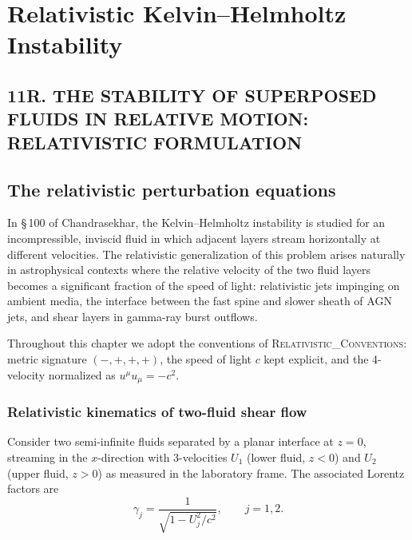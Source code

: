 
\chapter{Relativistic Kelvin--Helmholtz Instability}
\label{ch:rel-11-KH}

\section*{11R. THE STABILITY OF SUPERPOSED FLUIDS IN RELATIVE MOTION: RELATIVISTIC FORMULATION}

\section{The relativistic perturbation equations}\label{sec:rel-11-100}

In \S\,100 of Chandrasekhar, the Kelvin--Helmholtz instability is studied
for an incompressible, inviscid fluid in which adjacent layers stream
horizontally at different velocities. The relativistic generalization
of this problem arises naturally in astrophysical contexts where the
relative velocity of the two fluid layers becomes a significant fraction
of the speed of light: relativistic jets impinging on ambient media,
the interface between the fast spine and slower sheath of AGN jets, and
shear layers in gamma-ray burst outflows.

Throughout this chapter we adopt the conventions of
\textsc{Relativistic\_Conventions}: metric signature $(-,+,+,+)$,
the speed of light $c$ kept explicit, and the 4-velocity normalized as
$u^{\mu}u_{\mu} = -c^{2}$.

\subsection{Relativistic kinematics of two-fluid shear flow}

Consider two semi-infinite fluids separated by a planar interface
at $z=0$, streaming in the $x$-direction with 3-velocities $U_1$
(lower fluid, $z<0$) and $U_2$ (upper fluid, $z>0$) as measured in the
laboratory frame.  The associated Lorentz factors are
\begin{equation}\label{eq:rel-11-1}
  \gamma_j = \frac{1}{\sqrt{1 - U_j^{2}/c^{2}}}, \qquad j = 1,2.
\end{equation}

